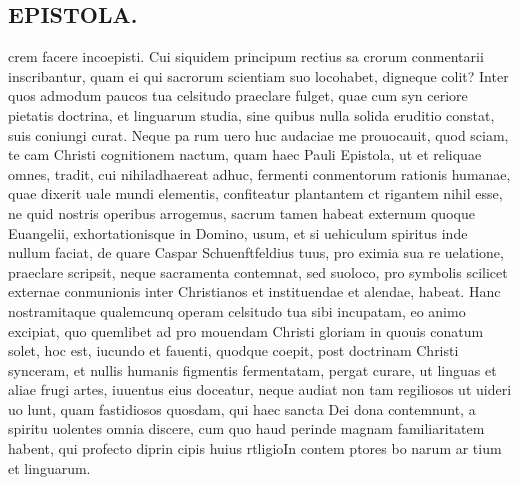 \documentclass{article}
\begin{document}
\begin{pages}
\section*{EPISTOLA. }\pstart crem facere incoepisti. Cui siquidem principum rectius sa crorum conmentarii inscribantur, quam ei qui sacrorum scientiam suo locohabet, digneque colit? Inter quos admodum paucos tua celsitudo praeclare fulget, quae cum syn ceriore pietatis doctrina, et linguarum studia, sine quibus nulla solida eruditio constat, suis coniungi curat. Neque pa rum uero huc audaciae me prouocauit, quod sciam, te cam Christi cognitionem nactum, quam haec Pauli Epistola, ut et reliquae omnes, tradit, cui nihiladhaereat adhuc, fermenti conmentorum rationis humanae, quae dixerit uale mundi elementis, confiteatur plantantem ct rigantem nihil esse, ne quid nostris operibus arrogemus, sacrum tamen habeat externum quoque Euangelii, exhortationisque in Domino, usum, et si uehiculum spiritus inde nullum faciat, de quare Caspar Schuenftfeldius tuus, pro eximia sua re uelatione, praeclare scripsit, neque sacramenta contemnat, sed suoloco, pro symbolis scilicet externae conmunionis inter Christianos et instituendae et alendae, habeat.  \pend\pstart Hanc nostramitaque qualemcunq operam celsitudo tua sibi incupatam, eo animo excipiat, quo quemlibet ad pro mouendam Christi gloriam in quouis conatum solet, hoc est, iucundo et fauenti, quodque coepit, post doctrinam Christi synceram, et nullis humanis figmentis fermentatam, pergat curare, ut linguas et aliae frugi artes, iuuentus eius doceatur, neque audiat non tam regiliosos ut uideri uo lunt, quam fastidiosos quosdam, qui haec sancta Dei dona contemnunt, a spiritu uolentes omnia discere, cum quo haud perinde magnam familiaritatem habent, qui profecto di\pendPura prin cipis huius rtligioIn contem ptores bo narum ar tium et linguarum. 

\end{pages}
\end{document}
